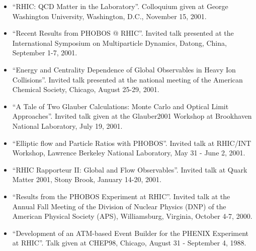 \documentclass[11 pt]{article}
\begin{document}
\begin{description}
\begin{itemize}
\item ``RHIC: QCD Matter in the Laboratory''.  Colloquium given at George Washington University, Washington, D.C., November 15, 2001.
\item ``Recent Results from PHOBOS @ RHIC''.  Invited talk presented at the International Symposium on Multiparticle Dynamics, Datong, China, September 1-7, 2001.
\item ``Energy and Centrality Dependence of Global Observables in Heavy Ion Collisions''.  Invited talk presented at the national meeting of the American Chemical Society, Chicago, August 25-29, 2001.
\item ``A Tale of Two Glauber Calculations: Monte Carlo and Optical Limit Approaches''.  Invited talk given at the Glauber2001 Workshop at Brookhaven National Laboratory, July 19, 2001.
\item ``Elliptic flow and Particle Ratios with PHOBOS''.  Invited talk at RHIC/INT Workshop, Lawrence Berkeley National Laboratory, May 31 - June 2, 2001.
\item ``RHIC Rapporteur II: Global and Flow Observables''.  Invited talk at Quark Matter 2001, Stony Brook, January 14-20, 2001.
\item ``Results from the PHOBOS Experiment at RHIC''.  Invited talk at the Annual Fall Meeting of the Division of Nuclear Physics (DNP) of the American Physical Society (APS), Williamsburg, Virginia, October 4-7, 2000.
\item ``Development of an ATM-based Event Builder for the PHENIX Experiment at RHIC''.  Talk given at CHEP98, Chicago, August 31 - September 4, 1988.

\end{itemize}
\end{description}
\end{document}
